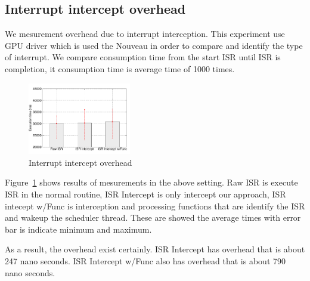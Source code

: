 \subsection{Interrupt intercept overhead}
We mesurement overhead due to interrupt interception.
This experiment use GPU driver which is used the Nouveau in order to compare and identify the type of interrupt.
We compare consumption time from the start ISR until ISR is completion, it consumption time is average time of 1000 times.



\begin{figure}[t]
\begin{center}
\includegraphics[width=0.4\textwidth]{img/interrupt.pdf}
\caption{Interrupt intercept overhead}
\end{center}
\label{fig:irq_overhead}
\end{figure}

Figure~\ref{fig:irq_overhead} shows results of mesurements in the above setting.
Raw ISR is execute ISR in the normal routine, ISR Intercept is only intercept our approach,
ISR intecept w/Func is interception and processing functions that are identify the ISR and wakeup the scheduler thread.
These are showed the average times with error bar is indicate minimum and maximum.

As a result, the overhead exist certainly.
ISR Intercept has overhead that is about 247 nano seconds.
ISR Intercept w/Func also has overhead that is about 790 nano seconds.

